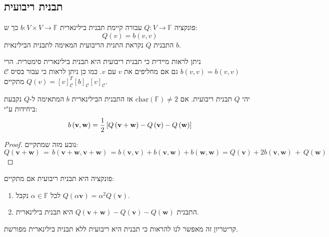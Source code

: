 \documentclass{tstextbook}
\begin{document}
\subsection{תבנית ריבועית}

\begin{definition}
פונקציה \(Q:V\to \mathbb{F}\) עבורה קיימת תבנית בילינארית \(b:V\times V\to \mathbb{F}\)  כך ש:
$$Q(v)=b(v,v)$$
התבנית \(Q\) נקראת התנית הריבועית המאימה לתבנית הבילינאית \(b\).

\end{definition}
\begin{remark}
ניתן לראות מיידית כי תבנית ריבועית היא תבנית בילינארית סימטרית. הרי \(b(v,v)=b(v,v)\) גם אם מחליפים את \(v\) עם \(v\). כמו כן ניתן לראות כי עבור בסיס \(\mathcal{ C}\) מתקיים \(Q(v)=[v]_{\mathcal{ C} }^{T}[b]_{\mathcal{C} }[v]_{\mathcal{ C} }\).

\end{remark}
\begin{proposition}[פולריזציה]
יהי \(Q\) תבנית ריבועית. אם \(\mathrm{char}\left( \mathbb{F}  \right)\neq 2\) אז התבנית הבילינארית \(b\) המתאימה ל-\(Q\) נקבעת ביחידות ע"י:
$$b\left( \mathbf{v},\mathbf{w} \right)=\frac{1}{2}\left[Q\left( {\bf v}+{\bf w} \right)-
Q\left( {\bf v} \right)-Q\left( {\bf w} \right)\right]$$

\end{proposition}
\begin{proof}
נובע מזה שמתקיים:
$$Q\left( \mathbf{v}+\mathbf{w} \right)\,=\,b\left( \mathbf{v}+\mathbf{w},\mathbf{v}+\mathbf{w} \right)\,=b\left( \mathbf{v},\mathbf{v} \right)+b\left( \mathbf{v},\mathbf{w} \right)+b\left( \mathbf{w},\mathbf{w} \right)=Q\left( \mathbf{v} \right)+2b\left( \mathbf{v},\mathbf{w} \right)\,+\,Q\left( \mathbf{w} \right)$$

\end{proof}
\begin{proposition}
פונקציה היא תבנית ריבועית אם מתקיים:

\end{proposition}
\begin{enumerate}
  \item לכל \(\alpha \in \mathbb{F}\) נקבל \(Q\left( \alpha \mathbf{v} \right)=\alpha^{2}Q\left( \mathbf{v} \right)\). 


  \item התבנית \(Q\left( \mathbf{v}+\mathbf{w} \right)-Q\left( \mathbf{v} \right)-Q\left( \mathbf{w} \right)\) היא תבנית בילינארית. 


\end{enumerate}
קריטריון זה מאפשר לנו להראות כי תבנית היא ריבועית ללא תבנית בילינארית מפורשת.
\end{document}
